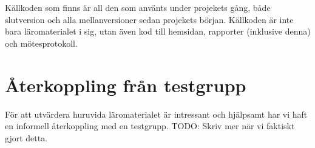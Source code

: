 \begin{binge}
Källkoden som finns är all den som använts under projekets gång, både slutversion och alla mellanversioner sedan projekets början. Källkoden är inte bara läromaterialet i sig, utan även kod till hemsidan, rapporter (inklusive denna) och mötesprotokoll.

\section{Återkoppling från testgrupp}

För att utvärdera huruvida läromaterialet är intressant och hjälpsamt har vi haft en informell återkoppling med en testgrupp. TODO: Skriv mer när vi faktiskt gjort detta.

\end{binge}
